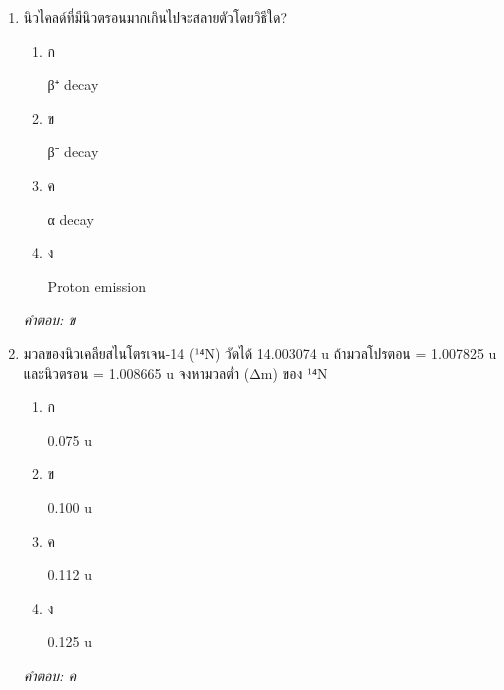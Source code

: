\documentclass[12pt]{article}
\begin{document}
\begin{enumerate}[label=\arabic*., itemsep=0.5\baselineskip, topsep=0.5\baselineskip, leftmargin=*]
\item นิวไคลด์ที่มีนิวตรอนมากเกินไปจะสลายตัวโดยวิธีใด?
\begin{enumerate}[label=\alph*)., itemsep=0.3\baselineskip, topsep=0.3\baselineskip]
\item ก\ 
\begin{minipage}[t]{0.9\linewidth}
\raggedright β⁺ decay
\end{minipage}
\item ข\ 
\begin{minipage}[t]{0.9\linewidth}
\raggedright β⁻ decay
\end{minipage}
\item ค\ 
\begin{minipage}[t]{0.9\linewidth}
\raggedright α decay
\end{minipage}
\item ง\ 
\begin{minipage}[t]{0.9\linewidth}
\raggedright Proton emission
\end{minipage}
\end{enumerate}
\vspace{-0.3\baselineskip}
\begin{small}
\textit{คำตอบ: ข}
\end{small}

\item มวลของนิวเคลียสไนโตรเจน-14 (¹⁴N) วัดได้ 14.003074 u ถ้ามวลโปรตอน = 1.007825 u และนิวตรอน = 1.008665 u จงหามวลต่ำ (Δm) ของ ¹⁴N
\begin{enumerate}[label=\alph*)., itemsep=0.3\baselineskip, topsep=0.3\baselineskip]
\item ก\ 
\begin{minipage}[t]{0.9\linewidth}
\raggedright 0.075 u
\end{minipage}
\item ข\ 
\begin{minipage}[t]{0.9\linewidth}
\raggedright 0.100 u
\end{minipage}
\item ค\ 
\begin{minipage}[t]{0.9\linewidth}
\raggedright 0.112 u
\end{minipage}
\item ง\ 
\begin{minipage}[t]{0.9\linewidth}
\raggedright 0.125 u
\end{minipage}
\end{enumerate}
\vspace{-0.3\baselineskip}
\begin{small}
\textit{คำตอบ: ค}
\end{small}


\end{enumerate}
\end{document}
